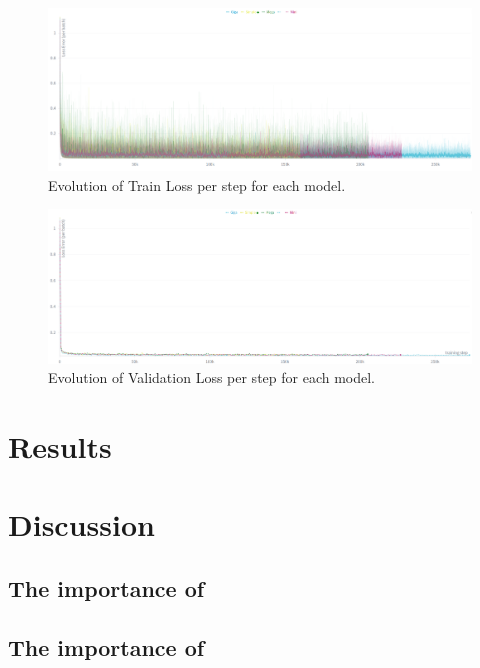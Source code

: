 \documentclass[twocolumn,superscriptaddress,aps]{revtex4-1}
\begin{document}
\begin{figure}[ht]
    \centering
    \includegraphics[width=\textwidth]{figures/train----Screenshot from 2025-08-13 19-55-18.png}
    \caption{Evolution of Train Loss per step for each model.}
    \label{fig:train-losses}
\end{figure}

\begin{figure}[ht]
    \centering
    \includegraphics[width=\textwidth]{figures/validation--Screenshot from 2025-08-13 19-56-31.png}
    \caption{Evolution of Validation Loss per step for each model.}
    \label{fig:val-losses}
\end{figure}

\section{Results}

\section{Discussion} %


\subsection{The importance of }


\subsection{The importance of }
\end{document}
